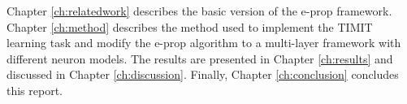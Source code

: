 Chapter \ref{ch:relatedwork} describes the basic version of the e-prop framework.
Chapter \ref{ch:method} describes the method used to implement the TIMIT learning task and modify the e-prop algorithm to a multi-layer framework with different neuron models.
The results are presented in Chapter \ref{ch:results} and discussed in Chapter \ref{ch:discussion}.
Finally, Chapter \ref{ch:conclusion} concludes this report.
